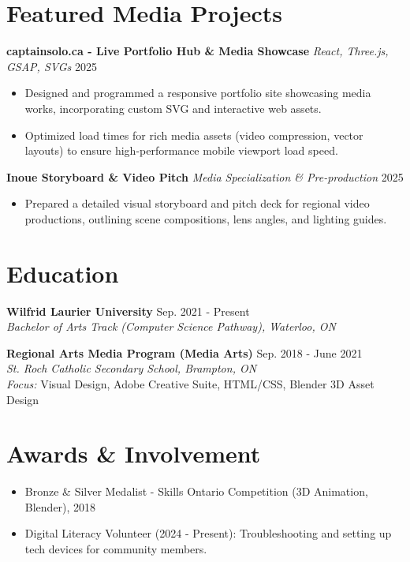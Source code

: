 \documentclass[a4paper,10pt]{article}
\begin{document}
\section*{Featured Media Projects}
\textbf{captainsolo.ca - Live Portfolio Hub & Media Showcase} \enspace\textbar\enspace \textit{React, Three.js, GSAP, SVGs} \hfill 2025
\begin{itemize}
    \item Designed and programmed a responsive portfolio site showcasing media works, incorporating custom SVG and interactive web assets.
    \item Optimized load times for rich media assets (video compression, vector layouts) to ensure high-performance mobile viewport load speed.
\end{itemize}

\vspace{3pt}
\textbf{Inoue Storyboard & Video Pitch} \enspace\textbar\enspace \textit{Media Specialization & Pre-production} \hfill 2025
\begin{itemize}
    \item Prepared a detailed visual storyboard and pitch deck for regional video productions, outlining scene compositions, lens angles, and lighting guides.
\end{itemize}

\section*{Education}
\textbf{Wilfrid Laurier University} \hfill Sep. 2021 - Present \\
\textit{Bachelor of Arts Track (Computer Science Pathway), Waterloo, ON}

\vspace{3pt}
\textbf{Regional Arts Media Program (Media Arts)} \hfill Sep. 2018 - June 2021 \\
\textit{St. Roch Catholic Secondary School, Brampton, ON} \\
\textit{Focus:} Visual Design, Adobe Creative Suite, HTML/CSS, Blender 3D Asset Design

\section*{Awards & Involvement}
\begin{itemize}
    \item Bronze & Silver Medalist - Skills Ontario Competition (3D Animation, Blender), 2018
    \item Digital Literacy Volunteer (2024 - Present): Troubleshooting and setting up tech devices for community members.
\end{itemize}
\end{document}
